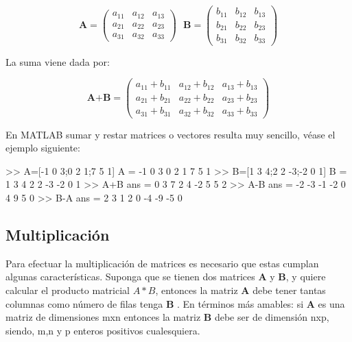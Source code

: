 $$
\textbf{A}=
\begin{pmatrix}
    a_{11} & a_{12} & a_{13} \\
    a_{21} & a_{22} & a_{23} \\
    a_{31} & a_{32} & a_{33}
\end{pmatrix}
\,\,\,\,
\textbf{B}=
\begin{pmatrix}
    b_{11} & b_{12} & b_{13} \\
    b_{21} & b_{22} & b_{23} \\
    b_{31} & b_{32} & b_{33}
\end{pmatrix}
$$

La suma viene dada por:

$$
\textbf{A+B} = \begin{pmatrix}
    a_{11}+b_{11} & a_{12}+b_{12} & a_{13}+b_{13} \\
    a_{21}+b_{21} & a_{22}+b_{22} & a_{23}+b_{23} \\
    a_{31}+b_{31} & a_{32}+b_{32} & a_{33}+b_{33}
\end{pmatrix}
$$

En MATLAB sumar y restar matrices o vectores resulta muy sencillo, véase
el ejemplo siguiente:

\begin{matlab}
>> A=[-1 0 3;0 2 1;7 5 1]
A =
    -1     0     3
     0     2     1
     7     5     1
>> B=[1 3 4;2 2 -3;-2 0 1]
B =
     1     3     4
     2     2    -3
    -2     0     1
>> A+B
ans =
     0     3     7
     2     4    -2
     5     5     2
>> A-B
ans =
    -2    -3    -1
    -2     0     4
     9     5     0
>> B-A
ans =
     2     3     1
     2     0    -4
    -9    -5     0
\end{matlab}

\subsection{Multiplicación}\label{multiplicacion}

Para efectuar la multiplicación de matrices es necesario que estas
cumplan algunas características. Suponga que se tienen dos matrices
\textbf{A} y \textbf{B}, y quiere calcular el producto matricial
$A \ast B$, entonces la matriz \textbf{A} debe tener tantas columnas
como número de filas tenga \textbf{B} . En términos más amables: si
\textbf{A} es una matriz de dimensiones mxn entonces la matriz \textbf{B} debe
ser de dimensión nxp, siendo, m,n y p enteros positivos cualesquiera.\\

